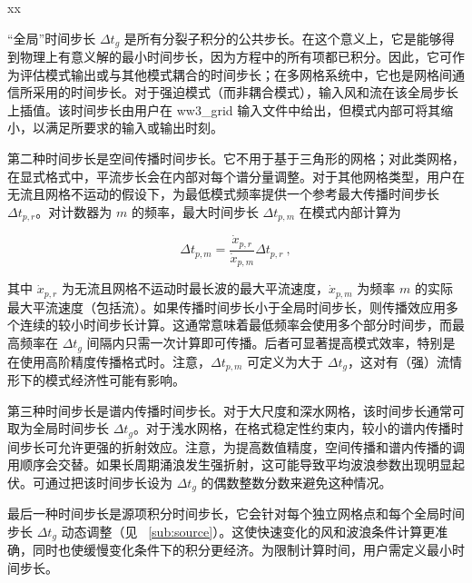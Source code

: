 \begin{list}{xx}{\itemsep 0mm \parsep 0mm \rightmargin 5mm}

\item[1)] “全局”时间步长 $\Delta t_g$ 是所有分裂子积分的公共步长。在这个意义上，它是能够得到物理上有意义解的最小时间步长，因为方程中的所有项都已积分。因此，它可作为评估模式输出或与其他模式耦合的时间步长；在多网格系统中，它也是网格间通信所采用的时间步长。对于强迫模式（而非耦合模式），输入风和流在该全局步长上插值。该时间步长由用户在 {\code ww3\_grid} 输入文件中给出，但模式内部可将其缩小，以满足所要求的输入或输出时刻。

\item[2)] 第二种时间步长是空间传播时间步长。它不用于基于三角形的网格；对此类网格，在显式格式中，平流步长会在内部对每个谱分量调整。对于其他网格类型，用户在无流且网格不运动的假设下，为最低模式频率提供一个参考最大传播时间步长 $\Delta t_{p,r}$。对计数器为 $m$ 的频率，最大时间步长 $\Delta t_{p,m}$ 在模式内部计算为


\begin{equation}
\Delta t_{p,m} = \frac{{\dot{x}}_{p,r}}{{\dot{x}}_{p,m}} \Delta t_{p,r}
\: , \label{eq:dtpl} \end{equation}

\noindent
其中 $\dot{x}_{p,r}$ 为无流且网格不运动时最长波的最大平流速度，$\dot{x}_{p,m}$ 为频率 $m$ 的实际最大平流速度（包括流）。如果传播时间步长小于全局时间步长，则传播效应用多个连续的较小时间步长计算。这通常意味着最低频率会使用多个部分时间步，而最高频率在 $\Delta t_g$ 间隔内只需一次计算即可传播。后者可显著提高模式效率，特别是在使用高阶精度传播格式时。注意，$\Delta t_{p,m}$ 可定义为大于 $\Delta t_g$，这对有（强）流情形下的模式经济性可能有影响。

\item[3)] 第三种时间步长是谱内传播时间步长。对于大尺度和深水网格，该时间步长通常可取为全局时间步长 $\Delta t_g$。对于浅水网格，在格式稳定性约束内，较小的谱内传播时间步长可允许更强的折射效应。注意，为提高数值精度，空间传播和谱内传播的调用顺序会交替。如果长周期涌浪发生强折射，这可能导致平均波浪参数出现明显起伏。可通过把该时间步长设为 $\Delta t_g$ 的偶数整数分数来避免这种情况。

\item[4)] 最后一种时间步长是源项积分时间步长，它会针对每个独立网格点和每个全局时间步长 $\Delta t_g$ 动态调整（见 \para~\ref{sub:source}）。这使快速变化的风和波浪条件计算更准确，同时也使缓慢变化条件下的积分更经济。为限制计算时间，用户需定义最小时间步长。

\end{list}

